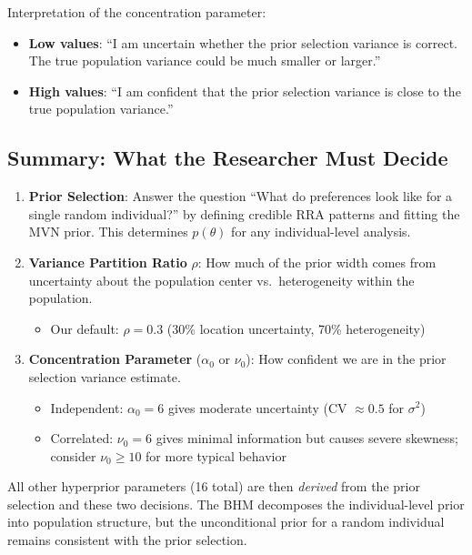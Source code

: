 \documentclass[11pt]{article}
\begin{document}
Interpretation of the concentration parameter:
\begin{itemize}
  \item \textbf{Low values}: ``I am uncertain whether the prior selection variance is correct. The true population variance could be much smaller or larger.''
  \item \textbf{High values}: ``I am confident that the prior selection variance is close to the true population variance.''
\end{itemize}

\subsection{Summary: What the Researcher Must Decide}

\begin{enumerate}
  \item \textbf{Prior Selection}: Answer the question ``What do preferences look like for a single random individual?'' by defining credible RRA patterns and fitting the MVN prior. This determines $p(\theta)$ for any individual-level analysis.

  \item \textbf{Variance Partition Ratio} $\rho$: How much of the prior width comes from uncertainty about the population center vs.\ heterogeneity within the population.
  \begin{itemize}
    \item Our default: $\rho = 0.3$ (30\% location uncertainty, 70\% heterogeneity)
  \end{itemize}

  \item \textbf{Concentration Parameter} ($\alpha_0$ or $\nu_0$): How confident we are in the prior selection variance estimate.
  \begin{itemize}
    \item Independent: $\alpha_0 = 6$ gives moderate uncertainty (CV $\approx 0.5$ for $\sigma^2$)
    \item Correlated: $\nu_0 = 6$ gives minimal information but causes severe skewness; consider $\nu_0 \geq 10$ for more typical behavior
  \end{itemize}
\end{enumerate}

All other hyperprior parameters (16 total) are then \textit{derived} from the prior selection and these two decisions. The BHM decomposes the individual-level prior into population structure, but the unconditional prior for a random individual remains consistent with the prior selection.
\end{document}
